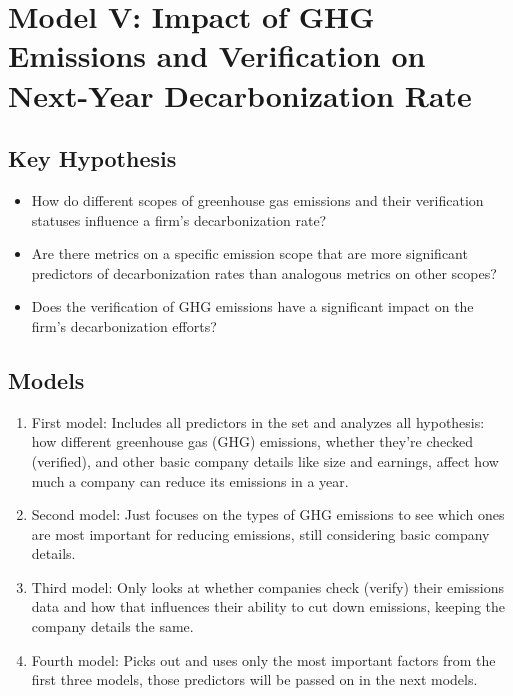 \section{Model V: Impact of GHG Emissions and Verification on Next-Year Decarbonization Rate}

\subsection{Key Hypothesis}
\begin{itemize}
    \item How do different scopes of greenhouse gas emissions and their verification statuses influence a firm's decarbonization rate?
    \item Are there metrics on a specific emission scope that are more significant predictors of decarbonization rates than analogous metrics on other scopes?
    \item Does the verification of GHG emissions have a significant impact on the firm's decarbonization efforts?
\end{itemize}

\subsection{Models}
\begin{enumerate}
    \item First model: Includes all predictors in the set and analyzes all hypothesis: how different greenhouse gas (GHG) emissions, whether they're checked (verified), and other basic company details like size and earnings, affect how much a company can reduce its emissions in a year.
    \item Second model: Just focuses on the types of GHG emissions to see which ones are most important for reducing emissions, still considering basic company details.
    \item Third model: Only looks at whether companies check (verify) their emissions data and how that influences their ability to cut down emissions, keeping the company details the same.
    \item Fourth model: Picks out and uses only the most important factors from the first three models, those predictors will be passed on in the next models.
\end{enumerate}



